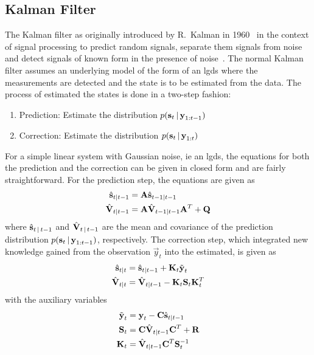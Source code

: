 	\subsection{Kalman Filter}
		The Kalman filter as originally introduced by R.~Kalman in 1960~\cite{kalmanNewApproachLinear1960} in the context of signal processing to predict random signals, separate them signals from noise and detect signals of known form in the presence of noise~\cite{kalmanNewApproachLinear1960}. The normal Kalman filter assumes an underlying model of the form of an \ac{lgds} where the measurements are detected and the state is to be estimated from the data. The process of estimated the states is done in a two-step fashion:
		\begin{enumerate}
			\item Prediction: \tabto{2.5cm} Estimate the distribution \( p(\boldsymbol{\mathrm{s}}_t \,\vert\, \boldsymbol{\mathrm{y}}_{1:t - 1}) \)
			\item Correction: \tabto{2.5cm} Estimate the distribution \( p(\boldsymbol{\mathrm{s}}_t \,\vert\, \boldsymbol{\mathrm{y}}_{1:t}) \)
		\end{enumerate}
		For a simple linear system with Gaussian noise, \ac{ie} an \ac{lgds}, the equations for both the prediction and the correction can be given in closed form and are fairly straightforward. For the prediction step, the equations are given as
		\begin{align}
			\hat{\boldsymbol{\mathrm{s}}}_{t \vert t - 1} &= \boldsymbol{\mathrm{A}} \hat{\boldsymbol{\mathrm{s}}}_{t - 1 \vert t - 1}  \label{eqn:kfStatePre} \\
			\hat{\boldsymbol{\mathrm{V}}}_{t \vert t - 1} &= \boldsymbol{\mathrm{A}} \hat{\boldsymbol{\mathrm{V}}}_{t - 1 \vert t - 1} \boldsymbol{\mathrm{A}}^T + \boldsymbol{\mathrm{Q}}  \label{eqn:kfCovPre}
		\end{align}
		where \( \hat{\boldsymbol{\mathrm{s}}}_{t \,\vert\, t - 1} \) and \( \hat{\boldsymbol{\mathrm{V}}}_{t \,\vert\, t - 1} \) are the mean and covariance of the prediction distribution \( p(\boldsymbol{\mathrm{s}}_t \,\vert\, \boldsymbol{\mathrm{y}}_{1:t - 1}) \), respectively. The correction step, which integrated new knowledge gained from the observation \( \vec{y}_t \) into the estimated, is given as
		\begin{align}
			\hat{\boldsymbol{\mathrm{s}}}_{t \vert t} &= \hat{\boldsymbol{\mathrm{s}}}_{t \vert t - 1} + \boldsymbol{\mathrm{K}}_t \tilde{\boldsymbol{\mathrm{y}}}_t  \label{eqn:kfStatePost} \\
			\hat{\boldsymbol{\mathrm{V}}}_{t \vert t} &= \hat{\boldsymbol{\mathrm{V}}}_{t \vert t - 1} - \boldsymbol{\mathrm{K}}_t \boldsymbol{\mathrm{S}}_t \boldsymbol{\mathrm{K}}_t^T  \label{eqn:kfCovPost}
		\end{align}
		with the auxiliary variables
		\begin{align}
			\tilde{\boldsymbol{\mathrm{y}}}_t &= \boldsymbol{\mathrm{y}}_t - \boldsymbol{\mathrm{C}} \hat{\boldsymbol{\mathrm{s}}}_{t \vert t - 1}  \label{eqn:kfInno} \\
			\boldsymbol{\mathrm{S}}_t &= \boldsymbol{\mathrm{C}} \hat{\boldsymbol{\mathrm{V}}}_{t \vert t - 1} \boldsymbol{\mathrm{C}}^T + \boldsymbol{\mathrm{R}}  \label{eqn:kfResCov} \\
			\boldsymbol{\mathrm{K}}_t &= \hat{\boldsymbol{\mathrm{V}}}_{t \vert t - 1} \boldsymbol{\mathrm{C}}^T \boldsymbol{\mathrm{S}}_t^{-1}  \label{eqn:kfKalmanGain}
		\end{align}
